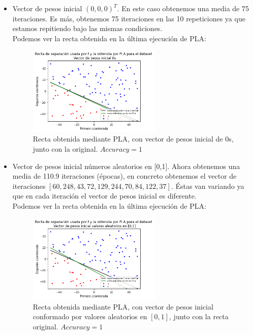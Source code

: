 \documentclass[11pt,a4paper]{article}
\theoremstyle{definition}
\begin{document}
		\begin{itemize}
			\item Vector de pesos inicial $(0,0,0)^T$. En este caso obtenemos una media de 75 iteraciones. Es más, obtenemos 75 iteraciones en las 10 repeticiones ya que estamos repitiendo bajo las mismas condiciones.\\ Podemos ver la recta obtenida en la última ejecución de PLA:
			\begin{figure}[H]
			\centering
			\includegraphics[width=0.6\textwidth]{images/pla_no_ruido_0s}
			\caption{Recta obtenida mediante PLA, con vector de pesos inicial de 0s, junto con la original. $Accuracy=1$}
			\end{figure}
			\item Vector de pesos inicial números aleatorios en [0,1]. Ahora obtenemos una media de 110.9 iteraciones (épocas), en concreto obtenemos el vector de iteraciones $[60, 248, 43, 72, 129, 244, 70, 84, 122, 37]$. Éstas van variando ya que en cada iteración el vector de pesos inicial es diferente.\\ Podemos ver la recta obtenida en la última ejecución de PLA:
			\begin{figure}[H]
			\centering
			\includegraphics[width=0.6\textwidth]{images/pla_no_ruido_random_vals}
			\caption{Recta obtenida mediante PLA, con vector de pesos inicial conformado por valores aleatorios en $[0,1]$, junto con la recta original. $Accuracy=1$}
			\end{figure}
		\end{itemize}
\end{document}
